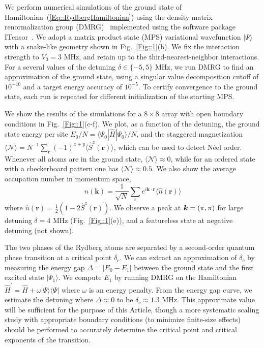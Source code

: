 \documentclass[twocolumn,english,reprint,superscriptaddress,longbibliography,pra]{revtex4-1}
\begin{document}
We perform numerical simulations of the ground state of Hamiltonian~(\ref{Eq::RydbergHamiltonian}) using the density matrix renormalization group (DMRG)~\cite{PhysRevLett.69.2863,PhysRevB.48.10345,SCHOLLWOCK201196} implemented using the software package ITensor~\cite{itensor}. We adopt a matrix product state (MPS) variational wavefunction $|\Psi\rangle$ with a snake-like geometry shown in Fig.~\ref{Fig::1}(b). We fix the interaction strength to $V_0=3$ MHz, and retain up to the third-nearest-neighbor interactions. For a several values of the detuning $\delta\in\{-5,5\}$ MHz, we run DMRG to find an approximation of the ground state, using a singular value decomposition cutoff of $10^{-10}$ and a target energy accuracy of $10^{-5}$. To certify convergence to the ground state, each run is repeated for different initialization of the starting MPS. 

We show the results of the simulations for a $8\times8$ array with open boundary conditions in Fig.~\ref{Fig::1}(c-f). We plot, as a function of the detuning, the ground state energy per site $E_0/N=\langle\Psi_0|\hat{H}|\Psi_0\rangle/N$, and the staggered magnetization  $\langle\mathcal{N}\rangle=N^{-1}\sum_{\bm{r}}(-1)^{x+y}\langle\hat{S}^z(\bm{r})\rangle$, which can be used to detect N\'eel order. Whenever all atoms are in the ground state, $\langle\mathcal{N}\rangle\approx0$, while for an ordered state with a checkerboard pattern one has $\langle\mathcal{N}\rangle\approx0.5$. We also show the average occupation number in momentum space, 
\begin{equation}
n(\bm{k})=\frac{1}{\sqrt{N}}\sum_{\bm{r}}e^{i\bm{k}\cdot\bm{r}}\langle\hat{n}(\bm{r})\rangle
\end{equation}
where $\hat{n}(\bm{r}) = \frac{1}{2}(1-2\hat{S}^z(\bm{r}))$. We observe a peak at $\linebreak\bm{k}=(\pi,\pi)$ for large detuning $\delta=4$ MHz (Fig.~\ref{Fig::1}(e)), and a featureless state at negative detuning (not shown).

The two phases of the Rydberg atoms are separated by a second-order quantum phase transition at a critical point $\delta_c$. We can  extract an approximation of $\delta_c$ by measuring the energy gap $\Delta = |E_0-E_1|$ between the ground state and the first excited state $|\Psi_1\rangle$. We compute $E_1$ by running DMRG on the Hamiltonian $\hat{H}^\prime=\hat{H}+\omega|\Psi\rangle\langle\Psi|$ where $\omega$ is an energy penalty. From the energy gap curve, we estimate the detuning where $\Delta\approx0$ to be $\delta_c\approx 1.3$ MHz. This approximate value will be sufficient for the purpose of this Article, though a more systematic scaling study with appropriate boundary conditions (to minimize finite-size effects) should be performed to accurately determine the critical point and critical exponents of the transition.
\end{document}

